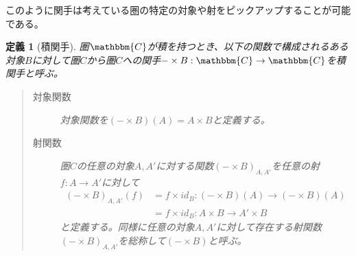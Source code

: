 \documentclass[dvipdfmx]{jsarticle}
\newcommand{\cat}[1]{\mathbbm{#1}}
\newcommand{\arrow}{\rightarrow}
\newcommand{\functor}[3]{#1:\cat{#2}\arrow \cat{#3}}
\newcommand{\mor}[3]{#1:#2\arrow #3}
\newtheorem{define}{定義}[section]
\numberwithin{proof}{subsection}
\numberwithin{prop}{subsection}
\numberwithin{define}{subsection}
\begin{document}
	このように関手は考えている圏の特定の対象や射をピックアップすることが可能である。
	\begin{define}[積関手]
		圏$\cat{C}$が積を持つとき、以下の関数で構成されるある対象$B$に対して圏$C$から圏$C$への関手$\functor{-\times B}{C}{C}$を積関手と呼ぶ。
		\begin{quote}
			\begin{description}
			\item[対象関数] 対象関数を$(-\times B)(A)=A\times B$と定義する。
			\item[射関数] 圏$C$の任意の対象$A,A'$に対する関数$(-\times B)_{A,A'}$を任意の射$\mor{f}{A}{A'}$に対して
			\begin{align*}
				(-\times B)_{A,A'}(f)&=\mor{f\times id_B}{(-\times B)(A)}{(-\times B)(A)}\\
				&=\mor{f\times id_B}{A\times B}{A'\times B}
			\end{align*}
			と定義する。同様に任意の対象$A,A'$に対して存在する射関数$(-\times B)_{A,A'}$を総称して$(-\times B)$と呼ぶ。
			\begin{center}
\end{center}
\end{description}
\end{quote}
\end{define}
\end{document}

